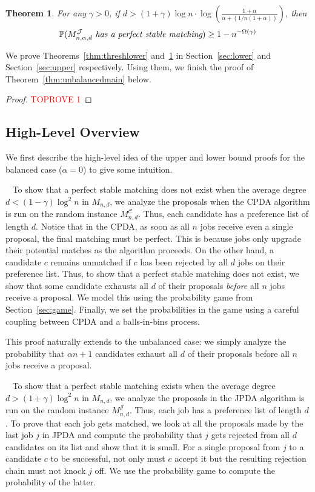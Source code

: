 \documentclass[11pt]{amsart}
\newtheorem{theorem}{Theorem}
\newcommand{\pparagraph}[1]{
\vspace{0.13in}\noindent{\textbf{\boldmath #1}}~}
\newcommand{\cal}[1]{\mathcal{#1}}
\begin{document}
\begin{theorem}\label{thm:threshupper}
 For any $\gamma > 0$, if $d > (1+\gamma) \log n \cdot \log \left( \frac {1+\alpha}{\alpha + (1/n(1+\alpha))} \right)$, then 
 \[\mathbb{P}(M_{n, \alpha, d}^{\cal{J}} \emph{ has a perfect stable matching}) \geq 1 -{n^{-\Omega(\gamma)}}\]
\end{theorem}

We prove Theorems~\ref{thm:threshlower} and~\ref{thm:threshupper} in Section~\ref{sec:lower} and Section~\ref{sec:upper} respectively.  Using them, we finish the proof of Theorem~\ref{thm:unbalancedmain} below.

\begin{proof}\textcolor{red}{TOPROVE 1}\end{proof}


\subsection{High-Level Overview}
We first describe the high-level idea of the upper and lower bound proofs for the balanced case ($\alpha=0$) to give some intuition.  

\pparagraph{Lower bound.}  To show that a perfect stable matching does not exist when the average degree $d < (1- \gamma) \log^2 n$ in $M_{n, d}$, we analyze the proposals when the CPDA algorithm is run on the random instance $M_{n, d}^{\mathcal{C}}$.  Thus, each candidate has a preference list of length $d$. Notice that in the CPDA, as soon as all $n$ jobs receive even a single proposal, the final matching must be perfect.  This is because jobs only upgrade their potential matches as the algorithm proceeds. On the other hand, a candidate $c$ remains unmatched if $c$ has been rejected by all $d$ jobs on their preference list.  Thus, to show that a perfect stable matching does not exist, we show that some candidate exhausts all $d$ of their proposals \emph{before} all $n$ jobs receive a proposal.  We model this using the probability game from Section~\ref{sec:game}.  Finally, we set the probabilities in the game using a careful coupling between CPDA and a balls-in-bins process.


This proof naturally extends to the unbalanced case:  we simply analyze the probability that $\alpha n + 1$ candidates exhaust all $d$ of their proposals before all $n$ jobs receive a proposal.

\pparagraph{Upper bound.} To show that a perfect stable matching exists when the average degree $d > (1+ \gamma) \log^2 n$ in $M_{n, d}$, we analyze the proposals in the JPDA algorithm is run on the random instance $M_{n, d}^{\mathcal{J}}$.  Thus, each job has a preference list of length $d$.
To prove that each job gets matched, we look at all the proposals made by the last job $j$ in JPDA and compute the probability that $j$ gets rejected from all $d$ candidates on its list and show that it is small.  For a single proposal from $j$ to a candidate $c$ to be successful, not only must $c$ accept it but the resulting rejection chain must not knock $j$ off.  We use the probability game to compute the probability of the latter.  
\end{document}
